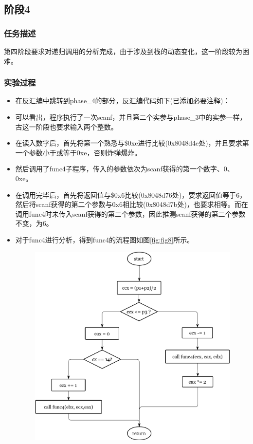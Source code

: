 \subsection{阶段4}
\subsubsection{任务描述}
第四阶段要求对递归调用的分析完成，由于涉及到栈的动态变化，这一阶段较为困难。

\subsubsection{实验过程}
\begin{itemize}
	\item 在反汇编中跳转到phase\_4的部分，反汇编代码如下(已添加必要注释)：
		\begin{codeFont}
			
		\end{codeFont}
	\item 可以看出，程序执行了一次scanf，并且第二个实参与phase\_3中的实参一样，古这一阶段也要求输入两个整数。
	\item 在读入数字后，首先将第一个熟悉与\$0xe进行比较(0x8048d4e处)，并且要求第一个参数小于或等于0xe，否则炸弹爆炸。
	\item 然后调用了func4子程序，传入的参数依次为scanf获得的第一个数字、0、0xe。
	\item 在调用完毕后，首先将返回值与\$0x6比较(0x8048d76处)，要求返回值等于6，然后将scanf获得的第二个参数与0x6相比较(0x8048d7b处)，也要求相等。而在调用func4时未传入scanf获得的第二个参数，因此推测scanf获得的第二个参数不变，为6。
	\item 对于func4进行分析，得到func4的流程图如图\ref{fig:fig8}所示。
		\begin{figure}[H]
			\centering
			\includegraphics[width=0.95\linewidth]{resources/fig8.png}

\end{figure}
\end{itemize}
